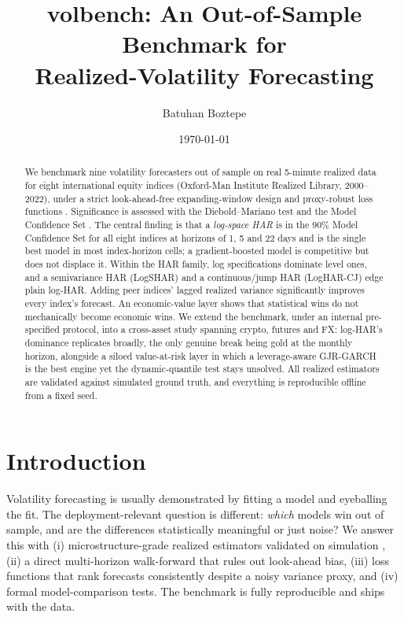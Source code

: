 \documentclass[11pt]{article}
\title{\textbf{volbench}: An Out-of-Sample Benchmark for\\ Realized-Volatility Forecasting}
\author{Batuhan Boztepe}
\date{\today}
\begin{document}
\maketitle

\begin{abstract}
We benchmark nine volatility forecasters out of sample on real 5-minute
realized data for eight international equity indices (Oxford-Man Institute
Realized Library, 2000--2022), under a strict look-ahead-free expanding-window
design and proxy-robust loss functions \cite{patton2011}. Significance is assessed
with the Diebold--Mariano test \cite{dm1995} and the Model Confidence Set \cite{hln2011}. The central finding is that a \emph{log-space HAR} is in the 90\%
Model Confidence Set for all eight indices at horizons of 1, 5 and 22 days and
is the single best model in most index-horizon cells; a gradient-boosted model
is competitive but does not displace it. Within the HAR family, log
specifications dominate level ones, and a semivariance HAR (LogSHAR) and a
continuous/jump HAR (LogHAR-CJ) edge plain log-HAR. Adding peer indices' lagged
realized variance significantly improves every index's forecast. An
economic-value layer shows that statistical wins do not mechanically become
economic wins. We extend the benchmark, under an internal pre-specified protocol,
into a cross-asset study spanning crypto, futures and FX: log-HAR's dominance
replicates broadly, the only genuine break being gold at the monthly horizon,
alongside a siloed value-at-risk layer in which a leverage-aware GJR-GARCH is the
best engine yet the dynamic-quantile test stays unsolved. All realized estimators
are validated against simulated ground truth, and everything is reproducible
offline from a fixed seed.
\end{abstract}

\section{Introduction}
Volatility forecasting is usually demonstrated by fitting a model and eyeballing
the fit. The deployment-relevant question is different: \emph{which} models win
out of sample, and are the differences statistically meaningful or just noise?
We answer this with (i) microstructure-grade realized estimators validated on
simulation \cite{abdl2003,ab1998}, (ii) a direct multi-horizon walk-forward that rules out look-ahead
bias, (iii) loss functions that rank forecasts consistently despite a noisy
variance proxy, and (iv) formal model-comparison tests. The benchmark is fully
reproducible and ships with the data.
\end{document}
